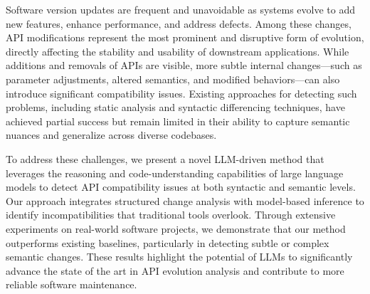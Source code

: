 Software version updates are frequent and unavoidable as systems evolve to add new features, enhance performance, and address defects. Among these changes, API modifications represent the most prominent and disruptive form of evolution, directly affecting the stability and usability of downstream applications. While additions and removals of APIs are visible, more subtle internal changes—such as parameter adjustments, altered semantics, and modified behaviors—can also introduce significant compatibility issues. Existing approaches for detecting such problems, including static analysis and syntactic differencing techniques, have achieved partial success but remain limited in their ability to capture semantic nuances and generalize across diverse codebases.

To address these challenges, we present a novel LLM-driven method that leverages the reasoning and code-understanding capabilities of large language models to detect API compatibility issues at both syntactic and semantic levels. Our approach integrates structured change analysis with model-based inference to identify incompatibilities that traditional tools overlook. Through extensive experiments on real-world software projects, we demonstrate that our method outperforms existing baselines, particularly in detecting subtle or complex semantic changes. These results highlight the potential of LLMs to significantly advance the state of the art in API evolution analysis and contribute to more reliable software maintenance.
